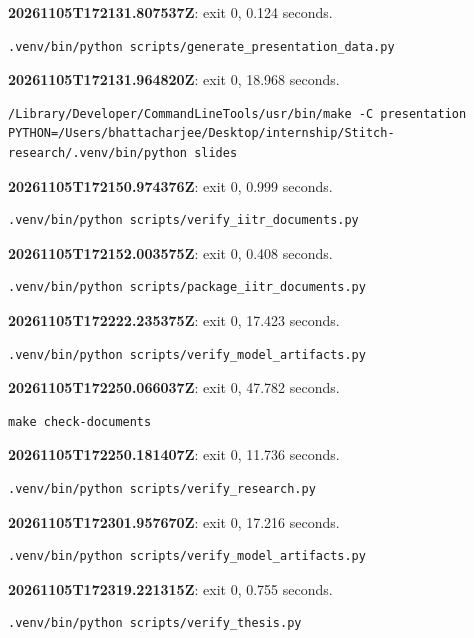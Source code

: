 \noindent\textbf{20261105T172131.807537Z}: exit 0, 0.124 seconds.
\begin{lstlisting}[numbers=none]
.venv/bin/python scripts/generate_presentation_data.py
\end{lstlisting}

\noindent\textbf{20261105T172131.964820Z}: exit 0, 18.968 seconds.
\begin{lstlisting}[numbers=none]
/Library/Developer/CommandLineTools/usr/bin/make -C presentation PYTHON=/Users/bhattacharjee/Desktop/internship/Stitch-research/.venv/bin/python slides
\end{lstlisting}

\noindent\textbf{20261105T172150.974376Z}: exit 0, 0.999 seconds.
\begin{lstlisting}[numbers=none]
.venv/bin/python scripts/verify_iitr_documents.py
\end{lstlisting}

\noindent\textbf{20261105T172152.003575Z}: exit 0, 0.408 seconds.
\begin{lstlisting}[numbers=none]
.venv/bin/python scripts/package_iitr_documents.py
\end{lstlisting}

\noindent\textbf{20261105T172222.235375Z}: exit 0, 17.423 seconds.
\begin{lstlisting}[numbers=none]
.venv/bin/python scripts/verify_model_artifacts.py
\end{lstlisting}

\noindent\textbf{20261105T172250.066037Z}: exit 0, 47.782 seconds.
\begin{lstlisting}[numbers=none]
make check-documents
\end{lstlisting}

\noindent\textbf{20261105T172250.181407Z}: exit 0, 11.736 seconds.
\begin{lstlisting}[numbers=none]
.venv/bin/python scripts/verify_research.py
\end{lstlisting}

\noindent\textbf{20261105T172301.957670Z}: exit 0, 17.216 seconds.
\begin{lstlisting}[numbers=none]
.venv/bin/python scripts/verify_model_artifacts.py
\end{lstlisting}

\noindent\textbf{20261105T172319.221315Z}: exit 0, 0.755 seconds.
\begin{lstlisting}[numbers=none]
.venv/bin/python scripts/verify_thesis.py
\end{lstlisting}

